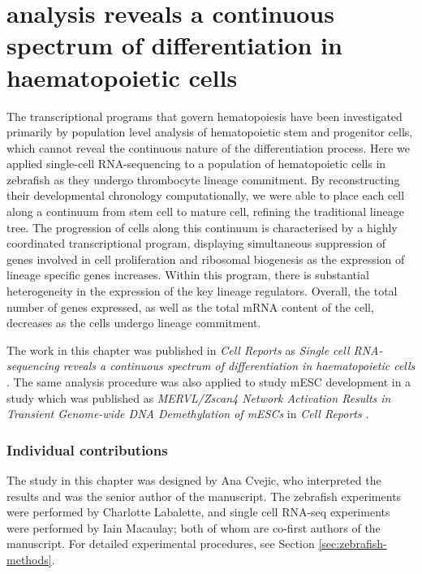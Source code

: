 
\chapter{ analysis reveals a continuous spectrum of differentiation in haematopoietic cells} \label{ch:zebrafish}

\graphicspath{{Chapter3/Figs/}}

The transcriptional programs that govern hematopoiesis have been investigated primarily by population level analysis of hematopoietic stem and progenitor cells, which cannot reveal the continuous nature of the differentiation process. Here we applied single-cell RNA-sequencing to a population of hematopoietic cells in zebrafish as they undergo thrombocyte lineage commitment. By reconstructing their developmental chronology computationally, we were able to place each cell along a continuum from stem cell to mature cell, refining the traditional lineage tree. The progression of cells along this continuum is characterised by a highly coordinated transcriptional program, displaying simultaneous suppression of genes involved in cell proliferation and ribosomal biogenesis as the expression of lineage specific genes increases. Within this program, there is substantial heterogeneity in the expression of the key lineage regulators. Overall, the total number of genes expressed, as well as the total mRNA content of the cell, decreases as the cells undergo lineage commitment.

The work in this chapter was published in \textit{Cell Reports} as \textit{Single cell RNA-sequencing reveals a continuous spectrum of differentiation in haematopoietic cells} \cite{Macaulay2016-zd}. The same analysis procedure was also applied to study mESC development in a study which was published as \textit{MERVL/Zscan4 Network Activation Results in Transient Genome-wide DNA Demethylation of mESCs} in \textit{Cell Reports} \cite{Eckersley-Maslin2016-cz}.

\subsection*{Individual contributions}

The study in this chapter was designed by Ana Cvejic, who interpreted the results and was the senior author of the manuscript. The zebrafish experiments were performed by Charlotte Labalette, and single cell RNA-seq experiments were performed by Iain Macaulay; both of whom are co-first authors of the manuscript. For detailed experimental procedures, see Section \ref{sec:zebrafish-methods}.

